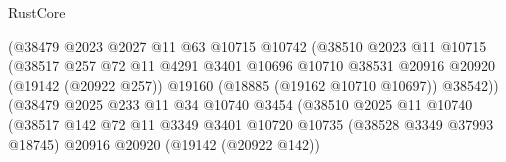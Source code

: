 \begin{lexlean}{RustCore}
\begin{coremodule}
                                        (@38479
                                          @2023
                                          @2027
                                          @11
                                          @63
                                          @10715
                                          @10742
                                          (@38510
                                            @2023
                                            @11
                                            @10715
                                            (@38517
                                              @257
                                              @72
                                              @11
                                              @4291
                                              @3401
                                              @10696
                                              @10710
                                              @38531
                                              @20916
                                              @20920
                                              (@19142 (@20922 @257))
                                              @19160
                                              (@18885 (@19162 @10710 @10697))
                                              @38542))
                                          (@38479
                                            @2025
                                            @233
                                            @11
                                            @34
                                            @10740
                                            @3454
                                            (@38510
                                              @2025
                                              @11
                                              @10740
                                              (@38517
                                                @142
                                                @72
                                                @11
                                                @3349
                                                @3401
                                                @10720
                                                @10735
                                                (@38528 @3349 @37993 @18745)
                                                @20916
                                                @20920
                                                (@19142 (@20922 @142))

\end{coremodule}
\end{lexlean}
